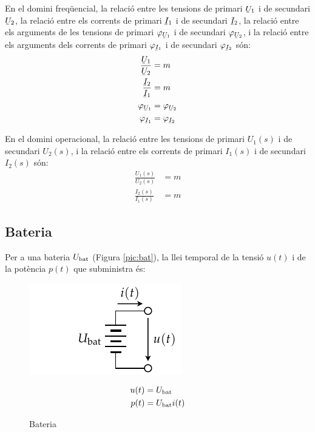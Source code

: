  En el domini
freq\"{u}encial, la relaci\'{o} entre les tensions de primari $\cmplx{U}_1$
i de secundari $\cmplx{U}_2$, la relaci\'{o} entre els corrents de
primari $\cmplx{I}_1$ i de secundari $\cmplx{I}_2$, la relaci\'{o} entre
els arguments de les tensions de primari $\varphi_{\cmplx{U}_1}$ i
de secundari $\varphi_{\cmplx{U}_2}$, i  la relaci\'{o} entre els
arguments dels corrents de primari $\varphi_{\cmplx{I}_1}$ i de
secundari $\varphi_{\cmplx{I}_2}$ s\'{o}n:
\begin{align}
   \frac{\cmplx{U}_1}{\cmplx{U}_2} &= m  \\
   \frac{\cmplx{I}_2}{\cmplx{I}_1} &= m \\
   \varphi_{\cmplx{U}_1} &= \varphi_{\cmplx{U}_2} \\
   \varphi_{\cmplx{I}_1} &= \varphi_{\cmplx{I}_2}
\end{align}

 En el domini operacional, la relaci\'{o} entre les tensions de primari $U_1(s)$ i de secundari $U_2(s)$,  i la relaci\'{o} entre els corrents de primari $I_1(s)$ i de secundari $I_2(s)$ s\'{o}n:
\begin{align}
   \frac{U_1(s)}{U_2(s)} &= m  \\
   \frac{I_2(s)}{I_1(s)} &= m
\end{align}

\subsection{Bateria} 

Per a una bateria $U_\mathrm{bat}$ (Figura
\vref{pic:bat}), la llei temporal de la tensi\'{o} $u(t)$ i de la
pot\`{e}ncia $p(t)$ que subministra \'{e}s:
\begin{figure}[h!]
\hfill
\begin{minipage}[b]{5cm}
    \includegraphics{Imatges/Cap-Fonaments-Bateria.pdf}
\caption{Bateria} \label{pic:bat}
\end{minipage}
\hfill
\begin{minipage}[b][3cm][t]{8cm}
   \begin{align}
      u(t) &= U_\mathrm{bat} \\  p(t) &= U_\mathrm{bat} i(t)
   \end{align}
\end{minipage}
\end{figure}


